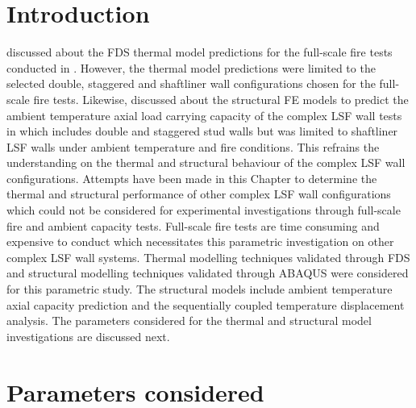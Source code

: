 \section{Introduction}

 discussed about the FDS thermal model predictions for the full-scale fire tests conducted in . However, the thermal model predictions were limited to the selected double, staggered and shaftliner wall configurations chosen for the full-scale fire tests. Likewise,  discussed about the structural FE models to predict the ambient temperature axial load carrying capacity of the complex LSF wall tests in  which includes double and staggered stud walls but was limited to shaftliner LSF walls under ambient temperature and fire conditions. This refrains the understanding on the thermal and structural behaviour of the complex LSF wall configurations. Attempts have been made in this Chapter to determine the thermal and structural performance of other complex LSF wall configurations which could not be considered for experimental investigations through full-scale fire and ambient capacity tests. Full-scale fire tests are time consuming and expensive to conduct which necessitates this parametric investigation on other complex LSF wall systems. Thermal modelling techniques validated through FDS and structural modelling techniques validated through ABAQUS were considered for this parametric study. The structural models include ambient temperature axial capacity prediction and the sequentially coupled temperature displacement analysis. The parameters considered for the thermal and structural model investigations are discussed next. 

\section{Parameters considered}

